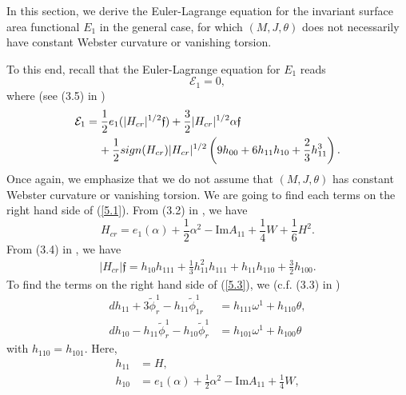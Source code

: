 \documentclass{amsart}
\theoremstyle{Corollary}
\numberwithin{equation}{section}
\begin{document}
In this section, we derive the Euler-Lagrange equation for the
invariant surface area functional $E_1$ in the general case, 
for which $(M,J,\theta)$ does not necessarily have
constant Webster curvature or vanishing torsion. 

To this end, recall that the Euler-Lagrange equation for $E_1$ reads
$$\mathcal{E}_1=0,$$
where (see (3.5) in \cite{CYZ})
\begin{equation}\label{5.1}
\begin{split}
\mathcal{E}_1&=\frac{1}{2}e_1(|H_{cr}|^{1/2}\mathfrak{f})+\frac{3}{2}|H_{cr}|^{1/2}\alpha\mathfrak{f}\\
&\hspace{4mm}+\frac{1}{2}sign(H_{cr})|H_{cr}|^{1/2}\left(9h_{00}+6h_{11}h_{10}+\frac{2}{3}h_{11}^3\right).
\end{split}
\end{equation}
Once again, we emphasize that we do not assume that  $(M,J,\theta)$ has
constant Webster curvature or vanishing torsion. 
We are going to find each terms on the right hand side of (\ref{5.1}). 
From (3.2) in \cite{CYZ}, we have
\begin{equation}\label{5.2}
H_{cr}=e_1(\alpha)+\frac{1}{2}\alpha^2-\mbox{Im} A_{11}+\frac{1}{4}W+\frac{1}{6}H^2. 
\end{equation}
From (3.4) in \cite{CYZ}, we have
\begin{equation}\label{5.3}
\begin{split}
|H_{cr}|\mathfrak{f}
=h_{10}h_{111}+\frac{1}{3}h_{11}^2h_{111}+h_{11}h_{110}+\frac{3}{2}h_{100}. 
\end{split}
\end{equation}
To find the terms on the right hand side of (\ref{5.3}), we 
(c.f. (3.3) in \cite{CYZ})
\begin{equation}\label{5.4}
\begin{split}
dh_{11}+3\widetilde{\phi}^1_r-h_{11}\widetilde{\phi}^1_{1r}&=h_{111}\omega^1+h_{110}\theta,\\
dh_{10}-h_{11}\widetilde{\phi}^1_r-h_{10}\widetilde{\phi}^1_r&=h_{101}\omega^1+h_{100}\theta
\end{split}
\end{equation}
with $h_{110}=h_{101}$. Here, 
 \begin{equation}\label{5.5}
\begin{split}
   h_{11}&=H,\\
   h_{10}&=e_1(\alpha)+\frac{1}{2}\alpha^2-\mbox{Im} A_{11}+\frac{1}{4}W,
\end{split}
\end{equation}
\end{document}
